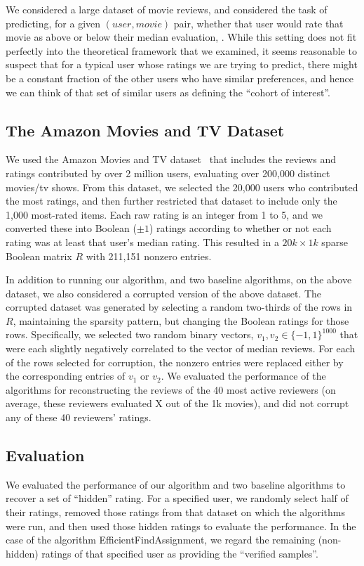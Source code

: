 \documentclass[anon,12pt]{colt2018}
\begin{document}
We considered a large dataset of movie reviews, and considered the task of predicting, for a given $(user, movie)$ pair, whether that user would rate that movie as above or below their median evaluation, .  While this setting does not fit perfectly into the theoretical framework that we examined, it seems reasonable to suspect that for a typical user whose ratings we are trying to predict, there might be a constant fraction of the other users who have similar preferences, and hence we can think of that set of similar users as defining the ``cohort of interest''.

\subsection{The Amazon Movies and TV Dataset}
We used the Amazon Movies and TV dataset~\cite{db1, db2} that includes the reviews and ratings contributed by over 2 million users, evaluating over 200,000 distinct movies/tv shows.   From this dataset, we selected the 20,000 users who contributed the most ratings, and then further restricted that dataset to include only the 1,000 most-rated items.  Each raw rating is an integer from 1 to 5,  and we converted these into Boolean ($\pm 1$) ratings according to whether or not each rating was at least that user's median rating.  This resulted in a $20k \times 1k$ sparse Boolean matrix $R$ with 211,151 nonzero entries.

In addition to running our algorithm, and two baseline algorithms, on the above dataset, we also considered a corrupted version of the above dataset.  The corrupted dataset was generated by selecting a random two-thirds of the rows in $R$, maintaining the sparsity pattern, but changing the Boolean ratings for those rows.  Specifically, we selected two random binary vectors, $v_1,v_2 \in \{-1,1\}^{1000}$ that were each slightly negatively correlated to the vector of median reviews.  For each of the rows selected for corruption, the nonzero entries were replaced either by the corresponding entries of $v_1$ or $v_2$.  We evaluated the performance of the algorithms for reconstructing the reviews of the 40 most active reviewers (on average, these reviewers evaluated X out of the 1k movies), and did not corrupt any of these 40 reviewers' ratings.

\subsection{Evaluation}
We evaluated the performance of our algorithm and two baseline algorithms to recover a set of ``hidden'' rating.  For a specified user, we randomly select half of their ratings, removed those ratings from that dataset on which the algorithms were run, and then used those hidden ratings to evaluate the performance.   In the case of the algorithm EfficientFindAssignment, we regard the remaining (non-hidden) ratings of that specified user as providing the ``verified samples''.
\end{document}
